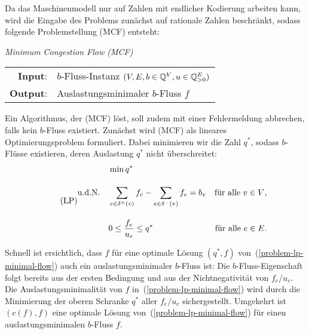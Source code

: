 Da das Maschinenmodell nur auf Zahlen mit endlicher Kodierung arbeiten kann, wird die Eingabe des Problems zunächst auf rationale Zahlen beschränkt, sodass folgende Problemstellung (MCF) entsteht:

\begin{centering}
	\begin{framed}
		\emph{Minimum Congestion Flow (MCF)} \\[1em]
		\begin{tabular}{rl}
			{\bfseries Input}: &$b$-Fluss-Instanz $(V, E, b\in\mathbb{Q}^V, u \in \mathbb{Q}^E_{>0})$\\
			{\bfseries Output}: &Auslastungsminimaler $b$-Fluss $f$
		\end{tabular}
	\end{framed}
\end{centering}

Ein Algorithmus, der (MCF) löst, soll zudem mit einer Fehlermeldung abbrechen, falls kein $b$-Fluss existiert.
Zunächst wird (MCF) als lineares Optimierungsproblem formuliert.
Dabei minimieren wir die Zahl $q^*$, sodass $b$-Flüsse existieren, deren Auslastung $q^*$ nicht überschreitet:
\begin{equation}\tag{LP}\label{problem-lp-minimal-flow}
\begin{aligned}
& \min q^* \\[1em]
\text{u.d.N.\quad} & \sum_{e\in \delta^+(v)} f_e - \sum_{e\in\delta^-(v)} f_e = b_v & \text{für alle $v\in V$,} \\[1em]
& 0 \leq \frac{f_e}{u_e} \leq q^* & \text{für alle $e\in E$.}
\end{aligned}
\end{equation}

Schnell ist ersichtlich, dass $f$ für eine optimale Lösung $(q^*, f)$ von~(\ref{problem-lp-minimal-flow}) auch ein auslastungsminimaler $b$-Fluss ist: Die $b$-Fluss-Eigenschaft folgt bereits aus der ersten Bedingung und aus der Nichtnegativität von $f_e / u_e$.
Die Auslastungsminimalität von $f$ in~(\ref{problem-lp-minimal-flow}) wird durch die Minimierung der oberen Schranke $q^*$ aller $f_e / u_e$ sichergestellt.
Umgekehrt ist $(c(f), f)$ eine optimale Lösung von~(\ref{problem-lp-minimal-flow}) für einen auslastungsminimalen $b$-Fluss $f$.

